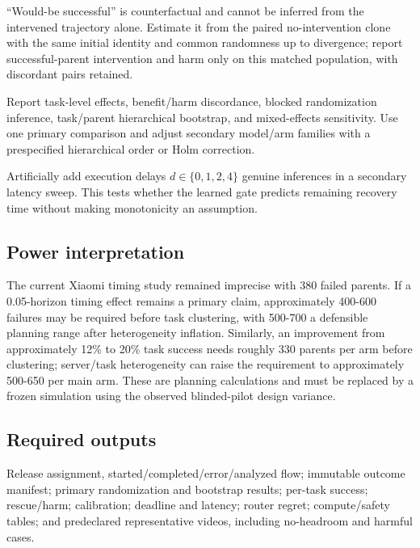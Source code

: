 ``Would-be successful'' is counterfactual and cannot be inferred from the intervened trajectory alone. Estimate it from the paired no-intervention clone with the same initial identity and common randomness up to divergence; report successful-parent intervention and harm only on this matched population, with discordant pairs retained.

Report task-level effects, benefit/harm discordance, blocked randomization inference, task/parent hierarchical bootstrap, and mixed-effects sensitivity. Use one primary comparison and adjust secondary model/arm families with a prespecified hierarchical order or Holm correction.

Artificially add execution delays $d\in\{0,1,2,4\}$ genuine inferences in a secondary latency sweep. This tests whether the learned gate predicts remaining recovery time without making monotonicity an assumption.



\subsection{Power interpretation}

The current Xiaomi timing study remained imprecise with 380 failed parents. If a 0.05-horizon timing effect remains a primary claim, approximately 400-600 failures may be required before task clustering, with 500-700 a defensible planning range after heterogeneity inflation. Similarly, an improvement from approximately 12\% to 20\% task success needs roughly 330 parents per arm before clustering; server/task heterogeneity can raise the requirement to approximately 500-650 per main arm. These are planning calculations and must be replaced by a frozen simulation using the observed blinded-pilot design variance.

\subsection{Required outputs}

Release assignment, started/completed/error/analyzed flow; immutable outcome manifest; primary randomization and bootstrap results; per-task success; rescue/harm; calibration; deadline and latency; router regret; compute/safety tables; and predeclared representative videos, including no-headroom and harmful cases.
